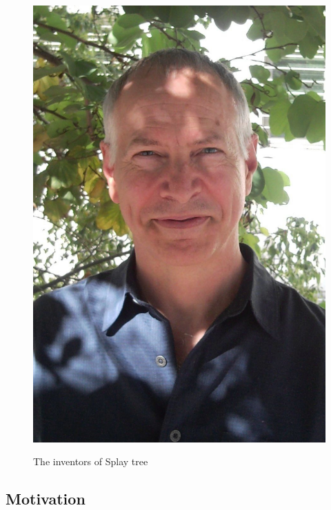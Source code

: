 \documentclass{beamer}
\begin{document}
\begin{frame}
\begin{figure}
{                \includegraphics[height=0.6\textheight]{pics/Robert_Tarjan.jpg}
            }
            \caption{The inventors of Splay tree}
        \end{figure}
    
    \end{frame}

    \subsection{Motivation}
\end{document}
